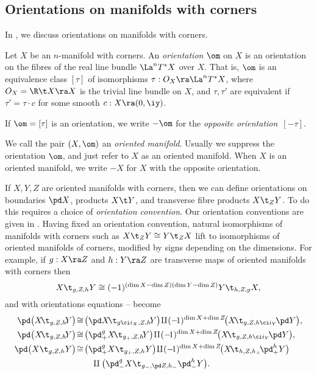 \documentclass{article}
\begin{document}
\subsection{Orientations on manifolds with corners}
\label{ds55}

In \cite[\S 7]{Joyc3}, \cite[\S 5.8]{Joyc6} we discuss orientations
on manifolds with corners.

\begin{dfn} Let $X$ be an $n$-manifold with corners. An {\it
orientation\/} $\om$ on $X$ is an orientation on the fibres of the
real line bundle $\La^nT^*X$ over $X$. That is, $\om$ is an
equivalence class $[\tau]$ of isomorphisms $\tau:O_X\ra\La^nT^*X$,
where $O_X=\R\t X\ra X$ is the trivial line bundle on $X$, and
$\tau,\tau'$ are equivalent if $\tau'=\tau\cdot c$ for some smooth
$c:X\ra(0,\iy)$.

If $\om=[\tau]$ is an orientation, we write $-\om$ for the {\it
opposite orientation\/}~$[-\tau]$.

We call the pair $(X,\om)$ an {\it oriented manifold}. Usually we
suppress the orientation $\om$, and just refer to $X$ as an oriented
manifold. When $X$ is an oriented manifold, we write $-X$ for $X$
with the opposite orientation.
\label{ds5def8}
\end{dfn}

If $X,Y,Z$ are oriented manifolds with corners, then we can define
orientations on boundaries $\pd X$, products $X\t Y$, and transverse
fibre products $X\t_ZY$. To do this requires a choice of {\it
orientation convention}. Our orientation
conventions are given in \cite[\S 5.8]{Joyc6}. Having fixed an
orientation convention, natural isomorphisms of manifolds with
corners such as $X\t_ZY\cong Y\t_ZX$ lift to isomorphisms of
oriented manifolds of corners, modified by signs depending on the
dimensions. For example, if $g:X\ra Z$ and $h:Y\ra Z$ are transverse
maps of oriented manifolds with corners then
\begin{equation*}
X\t_{g,Z,h}Y\cong (-1)^{(\dim X-\dim Z)(\dim Y-\dim Z)}Y\t_{h,Z,g}X,
\end{equation*}
and with orientations equations --
become
\begin{align*}
\pd\bigl(X\!\t_{g,Z,h}\!Y\bigr)\!&\cong \!\bigl(\pd X\!\t_{g\ci
i_X,Z,h}\!Y\bigr)\!\amalg\! (-\!1)^{\dim X+\dim
Z}\!\bigl(X\!\t_{g,Z,h\ci i_Y}\!\pd Y\bigr),\\
\pd\bigl(X\!\t_{g,Z,h}\!Y\bigr)\!&\cong\!\bigl(\pd_+^gX\!
\t_{g_+,Z,h}\!Y\bigr)\! \amalg\! (-\!1)^{\dim X+\dim
Z}\!\bigl(X\!\t_{g,Z,h\ci i_Y}\!\pd Y\bigr),\\
\pd\bigl(X\t_{g,Z,h}Y\bigr)\!&\cong\!\bigl(\pd_+^gX
\t_{g_+,Z,h}Y\bigr)\!\amalg\! (-\!1)^{\dim X+\dim Z}\!\bigl(X
\!\t_{h,Z,h_+}\!\pd_+^hY\bigr)\\
&\qquad \amalg\bigl(\pd_-^gX\t_{g_-,\pd Z,h_-}\pd_-^hY\bigr).
\end{align*}
\end{document}
